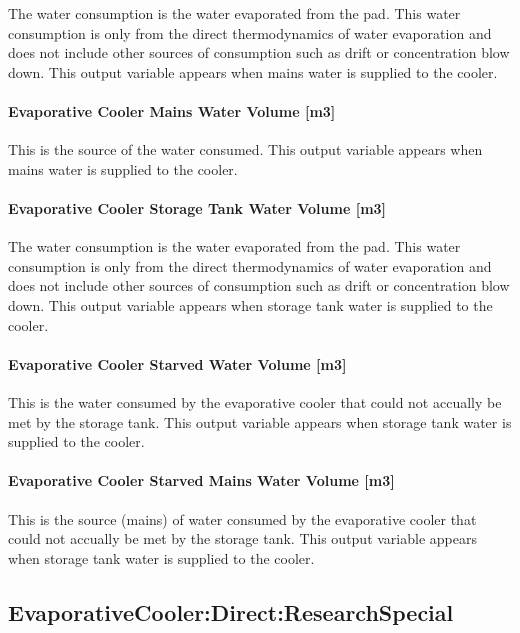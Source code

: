 The water consumption is the water evaporated from the pad. This water consumption is only from the direct thermodynamics of water evaporation and does not include other sources of consumption such as drift or concentration blow down. This output variable appears when mains water is supplied to the cooler.

\paragraph{Evaporative Cooler Mains Water Volume {[}m3{]}}\label{evaporative-cooler-mains-water-volume-m3}

This is the source of the water consumed. This output variable appears when mains water is supplied to the cooler.

\paragraph{Evaporative Cooler Storage Tank Water Volume {[}m3{]}}\label{evaporative-cooler-storage-tank-water-volume-m3}

The water consumption is the water evaporated from the pad. This water consumption is only from the direct thermodynamics of water evaporation and does not include other sources of consumption such as drift or concentration blow down. This output variable appears when storage tank water is supplied to the cooler.

\paragraph{Evaporative Cooler Starved Water Volume {[}m3{]}}\label{evaporative-cooler-starved-water-volume-m3}

This is the water consumed by the evaporative cooler that could not accually be met by the storage tank. This output variable appears when storage tank water is supplied to the cooler.

\paragraph{Evaporative Cooler Starved Mains Water Volume {[}m3{]}}\label{evaporative-cooler-starved-mains-water-volume-m3}

This is the source (mains) of water consumed by the evaporative cooler that could not accually be met by the storage tank. This output variable appears when storage tank water is supplied to the cooler.

\subsection{EvaporativeCooler:Direct:ResearchSpecial}\label{evaporativecoolerdirectresearchspecial}

